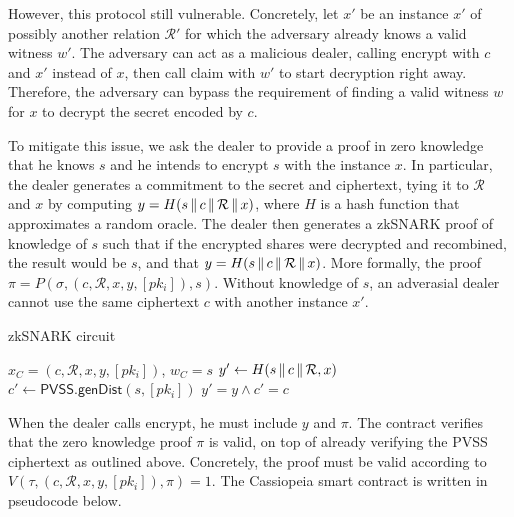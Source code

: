 However, this protocol still vulnerable.
Concretely, let $x'$ be an instance $x'$ of possibly another relation $\mathcal{R}'$ for which the adversary already knows a valid witness $w'$.
The adversary can act as a malicious dealer, calling \textsf{encrypt} with $c$ and $x'$ instead of $x$, then call \textsf{claim} with $w'$ to start decryption right away.
Therefore, the adversary can bypass the requirement of finding a valid witness $w$ for $x$ to decrypt the secret encoded by $c$.

To mitigate this issue, we ask the dealer to provide a proof in zero knowledge that he knows $s$ and he intends to encrypt $s$ with the instance $x$.
In particular, the dealer generates a commitment to the secret and ciphertext, tying it to $\mathcal{R}$ and $x$ by computing $y = H(s \,\|\, c \,\|\, \mathcal{R} \,\|\, x)$, where $H$ is a hash function that approximates a random oracle.
The dealer then generates a zkSNARK proof of knowledge of $s$ such that if the encrypted shares were decrypted and recombined, the result would be $s$, and that $y = H(s \,\|\, c \,\|\, \mathcal{R} \,\|\, x)$.
More formally, the proof $\pi = P(\sigma, (c, \mathcal{R}, x, y, [pk_i]), s)$.
Without knowledge of $s$, an adverasial dealer cannot use the same ciphertext $c$ with another instance $x'$.

\begin{algorithm}
    \caption{zkSNARK circuit}
    \label{alg:snark_circuit}
    \begin{algorithmic}[1]
        \Require $x_C = (c, \mathcal{R}, x, y, [pk_i])$, $w_C = s$
        \State $y' \gets H(s \,\|\, c \,\|\, \mathcal{R}, x)$
        \State $c' \gets \textsf{PVSS.genDist}(s, [pk_i])$
        \State \Return $y' = y \land c' = c$
    \end{algorithmic}
\end{algorithm}

When the dealer calls \textsf{encrypt}, he must include $y$ and $\pi$.
The contract verifies that the zero knowledge proof $\pi$ is valid, on top of already verifying the PVSS ciphertext as outlined above.
Concretely, the proof must be valid according to $V(\tau, (c, \mathcal{R}, x, y, [pk_i]), \pi) = 1$.
The Cassiopeia smart contract is written in pseudocode below.

